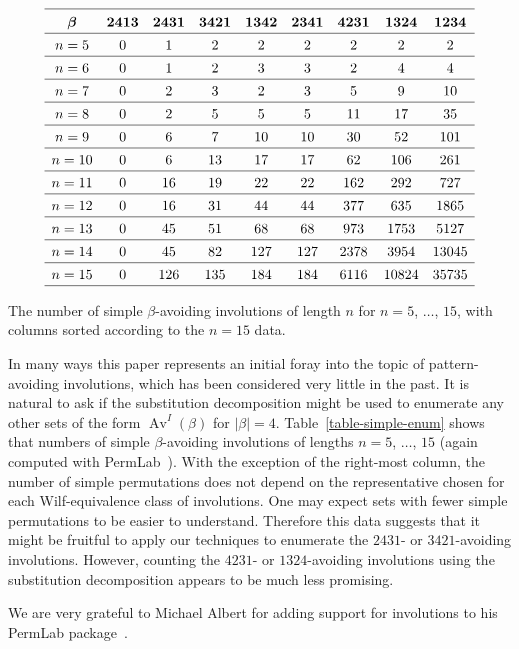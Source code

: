 \documentclass[10pt]{article}
\theoremstyle{plain}
\newcommand{\Av}{\operatorname{Av}}
\begin{document}
\begin{table}
\begin{footnotesize}
$$
\begin{array}{ccccccccc}%
\hline
&&&&&&&&\\[-8pt]
\bm{\beta}&\bm{2413}&\bm{2431}&\bm{3421}&\bm{1342}&\bm{2341}&\bm{4231}&\bm{1324}&\bm{1234}\\[1pt]\hline
&&&&&&&&\\[-9pt]
%
n=5&0&1&2&2&2&2&2&2
\\[1pt]\hline
&&&&&&&&\\[-9pt]
%
n=6&0&1&2&3&3&2&4&4
\\[1pt]\hline
&&&&&&&&\\[-9pt]
%
n=7&0&2&3&2&3&5&9&10
\\[1pt]\hline
&&&&&&&&\\[-9pt]
%
n=8&0&2&5&5&5&11&17&35
\\[1pt]\hline
&&&&&&&&\\[-9pt]
%
n=9&0&6&7&10&10&30&52&101
\\[1pt]\hline
&&&&&&&&\\[-9pt]
%
n=10&0&6&13&17&17&62&106&261
\\[1pt]\hline
&&&&&&&&\\[-9pt]
%
n=11&0&16&19&22&22&162&292&727
\\[1pt]\hline
&&&&&&&&\\[-9pt]
%
n=12&0&16&31&44&44&377&635&1865
\\[1pt]\hline
&&&&&&&&\\[-9pt]
%
n=13&0&45&51&68&68&973&1753&5127
\\[1pt]\hline
&&&&&&&&\\[-9pt]
%
n=14&0&45&82&127&127&2378&3954&13045
\\[1pt]\hline
&&&&&&&&\\[-9pt]
%
n=15&0&126&135&184&184&6116&10824&35735
\\[1pt]\hline
%
\end{array}
$$
\end{footnotesize}
\caption{The number of simple $\beta$-avoiding involutions of length $n$ for $n=5$, $\dots$, $15$, with columns sorted according to the $n=15$ data.}
\label{table-simple-enum}
\end{table}

In many ways this paper represents an initial foray into the topic of pattern-avoiding involutions, which has been considered very little in the past. It is natural to ask if the substitution decomposition might be used to enumerate any other sets of the form $\Av^I(\beta)$ for $|\beta|=4$. Table~\ref{table-simple-enum} shows that numbers of simple $\beta$-avoiding involutions of lengths $n=5$, $\dots$, $15$ (again computed with PermLab~\cite{PermLab1.0}). With the exception of the right-most column, the number of simple permutations does not depend on the representative chosen for each Wilf-equivalence class of involutions. One may expect sets with fewer simple permutations to be easier to understand. Therefore this data suggests that it might be fruitful to apply our techniques to enumerate the $2431$- or $3421$-avoiding involutions. However, counting the $4231$- or $1324$-avoiding involutions using the substitution decomposition appears to be much less promising.

\bigskip
{} We are very grateful to Michael Albert for adding support for involutions to his PermLab package~\cite{PermLab1.0}.



\end{document}
